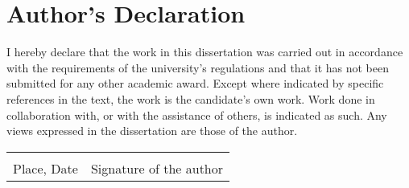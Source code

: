 \section*{Author's Declaration}

I hereby declare that the work in this dissertation was carried out in accordance with the requirements of the university's regulations and that it has not been submitted for any other academic award. Except where indicated by specific references in the text, the work is the candidate's own work. Work done in collaboration with, or with the assistance of others, is indicated as such. Any views expressed in the dissertation are those of the author.

\vspace{3 cm}

\begin{tabular}{ll}
	\makebox[0.3\textwidth]{\hrulefill} & \makebox[0.6\textwidth]{\hrulefill}\\
	Place, Date & Signature of the author\\
\end{tabular}